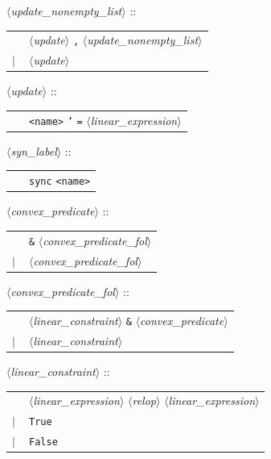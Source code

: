 \documentclass[a4paper,11pt]{report}
\newcommand{\nt}[1]{$\langle$\emph{#1}$\rangle$}
\newcommand{\regleGrammaire}[1]{\bigskip \noindent \nt{#1} :: \\}
\newcommand{\styleIMI}[1]{\textcolor{imicolor}{\texttt{#1}}}
\begin{document}
\regleGrammaire{update\_nonempty\_list}
\begin{tabular}{l l}
	\  & \nt{update} \styleIMI{,} \nt{update\_nonempty\_list} \\
	$|$ & \nt{update} \\
\end{tabular}

\regleGrammaire{update}
\begin{tabular}{l l}
	\  & \styleIMI{<name>} \styleIMI{'} \styleIMI{=} \nt{linear\_expression} \\
\end{tabular}

\regleGrammaire{syn\_label}
\begin{tabular}{l l}
	\  & \styleIMI{sync} \styleIMI{<name>} \\
\end{tabular}



\regleGrammaire{convex\_predicate}
\begin{tabular}{l l}
	\  & \styleIMI{\&} \nt{convex\_predicate\_fol} \\
	$|$ & \nt{convex\_predicate\_fol} \\
\end{tabular}

\regleGrammaire{convex\_predicate\_fol}
\begin{tabular}{l l}
	\  & \nt{linear\_constraint} \styleIMI{\&} \nt{convex\_predicate} \\
	$|$ & \nt{linear\_constraint} \\
\end{tabular}

\regleGrammaire{linear\_constraint}
\begin{tabular}{l l}
	\  & \nt{linear\_expression} \nt{relop} \nt{linear\_expression} \\
	$|$ & \styleIMI{True} \\
	$|$ & \styleIMI{False} \\
\end{tabular}
\end{document}
